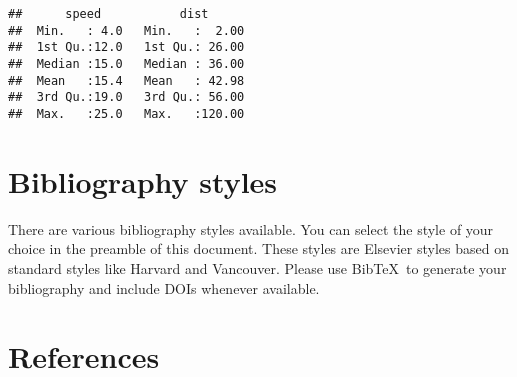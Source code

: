 \documentclass[]{elsarticle} %
\begin{document}
\begin{verbatim}
##      speed           dist       
##  Min.   : 4.0   Min.   :  2.00  
##  1st Qu.:12.0   1st Qu.: 26.00  
##  Median :15.0   Median : 36.00  
##  Mean   :15.4   Mean   : 42.98  
##  3rd Qu.:19.0   3rd Qu.: 56.00  
##  Max.   :25.0   Max.   :120.00
\end{verbatim}

\hypertarget{bibliography-styles}{%
\section{Bibliography styles}\label{bibliography-styles}}

There are various bibliography styles available. You can select the
style of your choice in the preamble of this document. These styles are
Elsevier styles based on standard styles like Harvard and Vancouver.
Please use BibTeX~to generate your bibliography and include DOIs
whenever available.

\hypertarget{references}{%
\section*{References}\label{references}}
\end{document}
